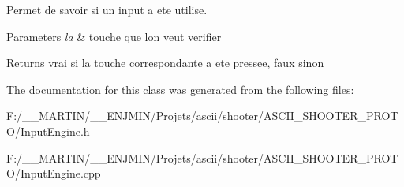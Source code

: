 Permet de savoir si un input a ete utilise. 


\begin{DoxyParams}{Parameters}
{\em la} & touche que l\textquotesingle{}on veut verifier \\
\hline
\end{DoxyParams}
\begin{DoxyReturn}{Returns}
vrai si la touche correspondante a ete pressee, faux sinon 
\end{DoxyReturn}


The documentation for this class was generated from the following files\+:\begin{DoxyCompactItemize}
\item 
F\+:/\+\_\+\+\_\+\+M\+A\+R\+T\+I\+N/\+\_\+\+\_\+\+E\+N\+J\+M\+I\+N/\+Projets/ascii/shooter/\+A\+S\+C\+I\+I\+\_\+\+S\+H\+O\+O\+T\+E\+R\+\_\+\+P\+R\+O\+T\+O/Input\+Engine.\+h\item 
F\+:/\+\_\+\+\_\+\+M\+A\+R\+T\+I\+N/\+\_\+\+\_\+\+E\+N\+J\+M\+I\+N/\+Projets/ascii/shooter/\+A\+S\+C\+I\+I\+\_\+\+S\+H\+O\+O\+T\+E\+R\+\_\+\+P\+R\+O\+T\+O/Input\+Engine.\+cpp\end{DoxyCompactItemize}
